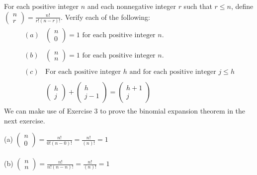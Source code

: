 \subsection{}
\begin{tcolorbox}
 For each positive integer $n$ and each nonnegative integer $r$   such that $r\leq n$, define $\left(\begin{matrix}n\\ r\end{matrix}\right) =\frac{n!}{r!(n- r)!}$. Verify each of the following:
 \begin{align*}
 \begin{array}{ll} 
(a)& \left(\begin{matrix}n\\ 0\end{matrix}\right) = 1\text{ for each positive integer } n. \\\\
(b) &\left(\begin{matrix}n\\ n\end{matrix}\right) = 1\text{ for each positive integer } n. \\\\
(c)& \text{For each positive integer }  h \text{ and for each positive integer } j\le h\\\\
& \left(\begin{matrix}h\\ j\end{matrix}\right)+\left(\begin{matrix}h\\ j-1\end{matrix}\right)=\left(\begin{matrix}h+1\\ j\end{matrix}\right)
\end{array}
\end{align*}
We can make use of Exercise 3 to prove the binomial expansion theorem in the next exercise. 
\end{tcolorbox}
$$ $$
(a) $\left(\begin{matrix}n\\ 0\end{matrix}\right) = \frac{n!}{0!(n- 0)!}=\frac{n!}{(n)!}=1$\\\\
(b) $\left(\begin{matrix}n\\ n\end{matrix}\right) = \frac{n!}{n!(n- n)!}=\frac{n!}{(n)!}=1$\\\\
